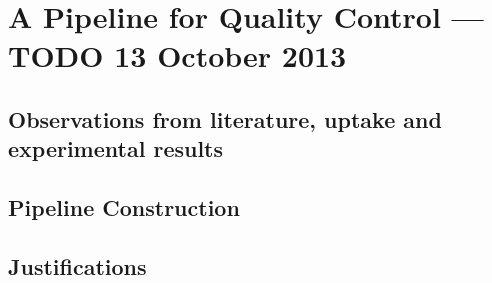 \section{A Pipeline for Quality Control --- TODO 13 October 2013}

\subsection{Observations from literature, uptake and experimental results}

\subsection{Pipeline Construction}

\subsection{Justifications}
